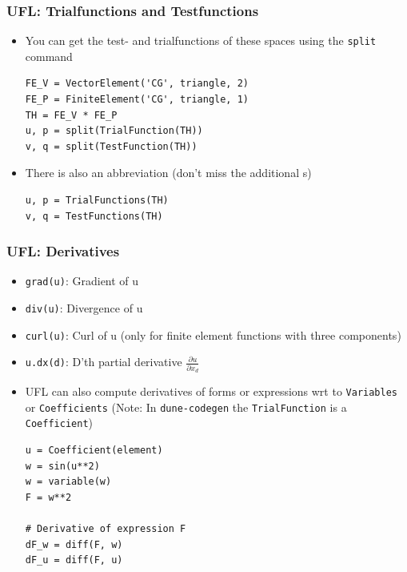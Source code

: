 \documentclass[ignorenonframetext,11pt]{beamer}
\theoremstyle{definition}
\begin{document}
\begin{frame}[fragile]
  \frametitle{UFL: Trialfunctions and Testfunctions}
  \begin{itemize}
  \item You can get the test- and trialfunctions of these spaces using the
    \lstinline{split} command
  \begin{lstlisting}[basicstyle=\small, backgroundcolor=\color{listingbg}]
FE_V = VectorElement('CG', triangle, 2)
FE_P = FiniteElement('CG', triangle, 1)
TH = FE_V * FE_P
u, p = split(TrialFunction(TH))
v, q = split(TestFunction(TH))
  \end{lstlisting}
  \item There is also an abbreviation (don't miss the additional s)
    \begin{lstlisting}[basicstyle=\small, backgroundcolor=\color{listingbg}]
u, p = TrialFunctions(TH)
v, q = TestFunctions(TH)
    \end{lstlisting}
  \end{itemize}
\end{frame}


\begin{frame}[fragile]
  \frametitle{UFL: Derivatives}
  \begin{itemize}
  \item \lstinline{grad(u)}: Gradient of u
  \item \lstinline{div(u)}: Divergence of u
  \item \lstinline{curl(u)}: Curl of u (only for finite element functions with
    three components)
  \item \lstinline{u.dx(d)}: D'th partial derivative $\frac{\partial u}{\partial x_d}$
  \item UFL can also compute derivatives of forms or expressions wrt to
    \lstinline{Variables} or \lstinline{Coefficients} (Note: In
    \lstinline{dune-codegen} the \lstinline{TrialFunction} is a
    \lstinline{Coefficient})
    \begin{lstlisting}[basicstyle=\scriptsize, backgroundcolor=\color{listingbg}]
u = Coefficient(element)
w = sin(u**2)
w = variable(w)
F = w**2

# Derivative of expression F
dF_w = diff(F, w)
dF_u = diff(F, u)
    \end{lstlisting}
  \end{itemize}
\end{frame}
\end{document}
